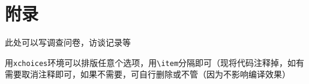 \chapter*{附录}

此处可以写调查问卷，访谈记录等

用\verb|xchoices|环境可以排版任意个选项，用\verb|\item|分隔即可（现将代码注释掉，如有需要取消注释即可，如果不需要，可自行删除或不管（因为不影响编译效果）



